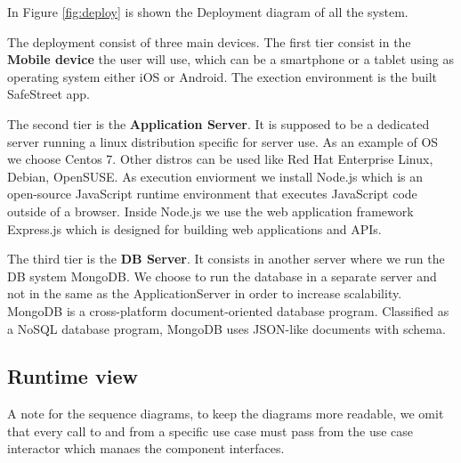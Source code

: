 In Figure \ref{fig:deploy} is shown the Deployment diagram of all the system.

The deployment consist of three main devices. The first tier consist in the \textbf{Mobile device} the user will use, which can be a smartphone or a tablet using as operating system either iOS or Android.
The exection environment is the built SafeStreet app.


The second tier is the \textbf{Application Server}. It is supposed to be a dedicated server running a linux distribution specific for server use. As an example of OS we choose Centos 7. Other distros can be used like Red Hat Enterprise Linux, Debian, OpenSUSE.
As execution enviorment we install Node.js which is an open-source JavaScript runtime environment that executes JavaScript code outside of a browser. Inside Node.js we use the web application framework Express.js which is designed for building web applications and APIs.

The third tier is the \textbf{DB Server}. It consists in another server where we run the DB system MongoDB. We choose to run the database in a separate server and not in the same as the ApplicationServer in order to increase scalability. MongoDB is a cross-platform document-oriented database program. Classified as a NoSQL database program, MongoDB uses JSON-like documents with schema.

\subsection{Runtime view}
A note for the sequence diagrams, to keep the diagrams more readable, we omit that every call to and from a specific use case must pass from the use case interactor which manaes the component interfaces.


